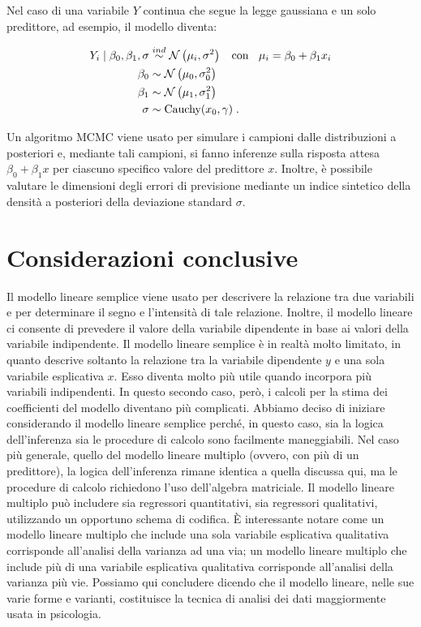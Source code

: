 \documentclass[
  11pt,
]{krantz}
\theoremstyle{definition}
\theoremstyle{definition}
\theoremstyle{definition}
\theoremstyle{definition}
\theoremstyle{remark}
\begin{document}
Nel caso di una variabile \(Y\) continua che segue la legge gaussiana e un solo predittore, ad esempio, il modello diventa:

\begin{align} 
Y_i \mid \beta_0, \beta_1, \sigma  &\stackrel{ind}{\sim} \mathcal{N}\left(\mu_i, \sigma^2\right) \;\; \text{ con } \;\; \mu_i = \beta_0 + \beta_1 x_i \notag\\
\beta_0  &\sim \mathcal{N}\left(\mu_0, \sigma_0^2 \right)  \notag\\
\beta_1  & \sim \mathcal{N}\left(\mu_1, \sigma_1^2 \right) \notag\\
\sigma & \sim \text{Cauchy}(x_0, \gamma) \; .\notag
\end{align}

Un algoritmo MCMC viene usato per simulare i campioni dalle distribuzioni a posteriori e, mediante tali campioni, si fanno inferenze sulla risposta attesa \(\beta_0 + \beta_1 x\) per ciascuno specifico valore del predittore \(x\). Inoltre, è possibile valutare le dimensioni degli errori di previsione mediante un indice sintetico della densità a posteriori della deviazione standard \(\sigma\).

\hypertarget{considerazioni-conclusive-3}{%
\section*{Considerazioni conclusive}\label{considerazioni-conclusive-3}}


Il modello lineare semplice viene usato per descrivere la relazione tra due variabili e per determinare il segno e l'intensità di tale relazione. Inoltre, il modello lineare ci consente di prevedere il valore della variabile dipendente in base ai valori della variabile indipendente. Il modello lineare semplice è in realtà molto limitato, in quanto descrive soltanto la relazione tra la variabile dipendente \(y\) e una sola variabile esplicativa \(x\). Esso diventa molto più utile quando incorpora più variabili indipendenti. In questo secondo caso, però, i calcoli per la stima dei coefficienti del modello diventano più complicati. Abbiamo deciso di iniziare considerando il modello lineare semplice perché, in questo caso, sia la logica dell'inferenza sia le procedure di calcolo sono facilmente maneggiabili. Nel caso più generale, quello del modello lineare multiplo (ovvero, con più di un predittore), la logica dell'inferenza rimane identica a quella discussa qui, ma le procedure di calcolo richiedono l'uso dell'algebra matriciale. Il modello lineare multiplo può includere sia regressori quantitativi, sia regressori qualitativi, utilizzando un opportuno schema di codifica. È interessante notare come un modello lineare multiplo che include una sola variabile esplicativa qualitativa corrisponde all'analisi della varianza ad una via; un modello lineare multiplo che include più di una variabile esplicativa qualitativa corrisponde all'analisi della varianza più vie. Possiamo qui concludere dicendo che il modello lineare, nelle sue varie forme e varianti, costituisce la tecnica di analisi dei dati maggiormente usata in psicologia.
\end{document}
